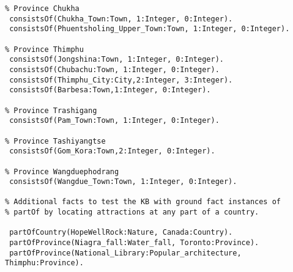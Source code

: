 \begin{verbatim}
% Province Chukha
 consistsOf(Chukha_Town:Town, 1:Integer, 0:Integer).
 consistsOf(Phuentsholing_Upper_Town:Town, 1:Integer, 0:Integer).

% Province Thimphu
 consistsOf(Jongshina:Town, 1:Integer, 0:Integer).
 consistsOf(Chubachu:Town, 1:Integer, 0:Integer).
 consistsOf(Thimphu_City:City,2:Integer, 3:Integer).
 consistsOf(Barbesa:Town,1:Integer, 0:Integer).
 
% Province Trashigang
 consistsOf(Pam_Town:Town, 1:Integer, 0:Integer).

% Province Tashiyangtse
 consistsOf(Gom_Kora:Town,2:Integer, 0:Integer).

% Province Wangduephodrang
 consistsOf(Wangdue_Town:Town, 1:Integer, 0:Integer).
 
% Additional facts to test the KB with ground fact instances of 
% partOf by locating attractions at any part of a country.

 partOfCountry(HopeWellRock:Nature, Canada:Country).
 partOfProvince(Niagra_fall:Water_fall, Toronto:Province).
 partOfProvince(National_Library:Popular_architecture, Thimphu:Province).
\end{verbatim}

